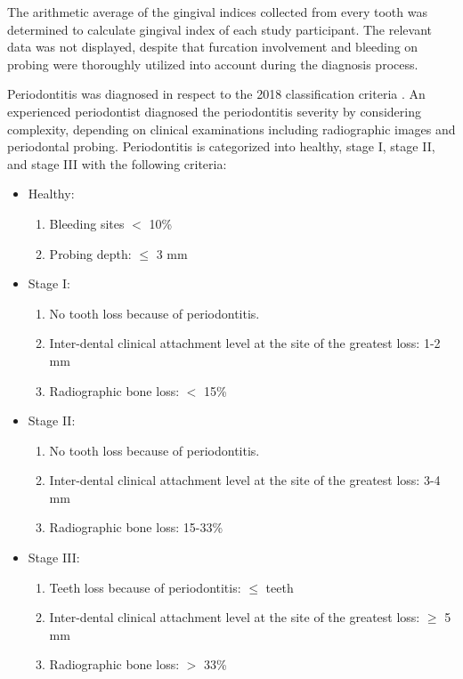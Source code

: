 \documentclass[11pt, a4paper, onecolumn, oneside]{report}
\begin{document}
                The arithmetic average of the gingival indices collected from every tooth was determined to calculate gingival index of each study participant. The relevant data was not displayed, despite that furcation involvement and bleeding on probing were thoroughly utilized into account during the diagnosis process.

                Periodontitis was diagnosed in respect to the 2018 classification criteria  \cite{Periodontitis-4, Periodontitis-13}. An experienced periodontist diagnosed the periodontitis severity by considering complexity, depending on clinical examinations including radiographic images and periodontal probing. Periodontitis is categorized into healthy, stage I, stage II, and stage III with the following criteria:
                \begin{itemize}
                    \item Healthy:
                    \begin{enumerate}
                        \item Bleeding sites $<$ 10\%
                        \item Probing depth: $\le$ 3 mm
                    \end{enumerate}

                    \item Stage I:
                    \begin{enumerate}
                        \item No tooth loss because of periodontitis.
                        \item Inter-dental clinical attachment level at the site of the greatest loss: 1-2 mm
                        \item Radiographic bone loss: $<$ 15\%
                    \end{enumerate}

                    \item Stage II:
                    \begin{enumerate}
                        \item No tooth loss because of periodontitis.
                        \item Inter-dental clinical attachment level at the site of the greatest loss: 3-4 mm
                        \item Radiographic bone loss: 15-33\%
                    \end{enumerate}

                    \item Stage III:
                    \begin{enumerate}
                        \item Teeth loss because of periodontitis: $\le$ teeth
                        \item Inter-dental clinical attachment level at the site of the greatest loss: $\ge$ 5 mm
                        \item Radiographic bone loss: $>$ 33\%
                    \end{enumerate}
                \end{itemize}
\end{document}
